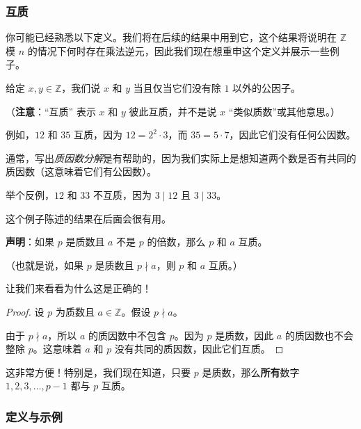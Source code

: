 \subsubsection*{互质}

你可能已经熟悉以下定义。我们将在后续的结果中用到它，这个结果将说明在 $\mathbb{Z}$ 模 $n$ 的情况下何时存在乘法逆元，因此我们现在想重申这个定义并展示一些例子。

\begin{definition}
    给定 $x,y \in \mathbb{Z}$，我们说 $x$ 和 $y$ 当且仅当它们没有除 $1$ 以外的公因子。
\end{definition}

（\textbf{注意}：``互质'' 表示 $x$ 和 $y$ 彼此互质，并不是说 $x$ ``类似质数''或其他意思。）\\

\begin{example}
    例如，$12$ 和 $35$ 互质，因为 $12 = 2^2 \cdot 3$，而 $35 = 5 \cdot 7$，因此它们没有任何公因数。

    通常，写出\emph{质因数分解}是有帮助的，因为我们实际上是想知道两个数是否有共同的质因数（这意味着它们有公因数）。

    举个反例，$12$ 和 $33$ 不互质，因为 $3 \mid 12$ 且 $3 \mid 33$。
\end{example}

\begin{example}
    这个例子陈述的结果在后面会很有用。

    \textbf{声明}：如果 $p$ 是质数且 $a$ 不是 $p$ 的倍数，那么 $p$ 和 $a$ 互质。

    （也就是说，如果 $p$ 是质数且 $p \nmid a$，则 $p$ 和 $a$ 互质。）

    让我们来看看为什么这是正确的！

    \begin{proof}
        设 $p$ 为质数且 $a \in \mathbb{Z}$。假设 $p \nmid a$。

        由于 $p \nmid a$，所以 $a$ 的质因数中不包含 $p$。因为 $p$ 是质数，因此 $a$ 的质因数也不会整除 $p$。这意味着 $a$ 和 $p$ 没有共同的质因数，因此它们互质。
    \end{proof}

    这非常方便！特别是，我们现在知道，只要 $p$ 是质数，那么\textbf{所有}数字 $1, 2, 3, \dots , p-1$ 都与 $p$ 互质。
\end{example}

\subsubsection*{定义与示例}

